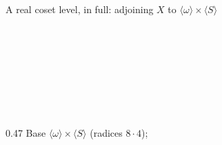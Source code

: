 \begin{frame}{A real coset level, in full: adjoining $X$ to $\langle\omega\rangle\times\langle S\rangle$ \InPaper}
\begin{code}[hide]
%
\>[4]\AgdaSpace{}%
\AgdaSymbol{:}\AgdaSpace{}%
\AgdaSpace{}%
\<%
\\
%
\>[4]\AgdaSpace{}%
\AgdaSymbol{:}\AgdaSpace{}%
\AgdaSpace{}%
\AgdaSpace{}%
\AgdaSpace{}%
\AgdaSpace{}%
\AgdaSpace{}%
\AgdaSpace{}%
\AgdaSpace{}%
\AgdaSpace{}%
\AgdaSpace{}%
\AgdaSpace{}%
\<%
\\
%
\>[4]\AgdaSpace{}%
\AgdaSymbol{:}\AgdaSpace{}%
\AgdaSpace{}%
\AgdaSymbol{\{}\AgdaSpace{}%
\AgdaSymbol{:}\AgdaSpace{}%
\AgdaSymbol{\}}\AgdaSpace{}%
\AgdaSpace{}%
\<%
\\
%
\>[2]\AgdaSpace{}%
\AgdaSpace{}%
\AgdaSpace{}%
\AgdaSymbol{(}\AgdaSymbol{)}\<%
\\
%
\>[2]\AgdaSpace{}%
\AgdaOperator{\AgdaDatatype{\AgdaUnderscore{}==\AgdaUnderscore{}}}\AgdaSpace{}%
\AgdaSymbol{:}\AgdaSpace{}%
\AgdaSpace{}%
\AgdaSpace{}%
\<%
\\
\>[2][@{}l@{\AgdaIndent{0}}]%
\>[4]\AgdaSpace{}%
\AgdaSpace{}%
\AgdaSpace{}%
\AgdaSpace{}%
\AgdaSymbol{:}\AgdaSpace{}%
\AgdaSpace{}%
\AgdaOperator{\AgdaDatatype{==}}\AgdaSpace{}%
\<%
\\
%
\>[4]\AgdaSpace{}%
\AgdaSymbol{:}\AgdaSpace{}%
\AgdaSpace{}%
\AgdaSymbol{\{}\AgdaSpace{}%
\AgdaSymbol{:}\AgdaSpace{}%
\AgdaSymbol{\}}\AgdaSpace{}%
\AgdaSpace{}%
\AgdaSpace{}%
\AgdaOperator{\AgdaDatatype{==}}\AgdaSpace{}%
\<%
\end{code}
\begin{columns}[T]
\begin{column}{0.47\textwidth}
\small Base $\langle\omega\rangle\times\langle S\rangle$ (radices $8\cdot 4$);

\end{column}
\end{columns}
\end{frame}
